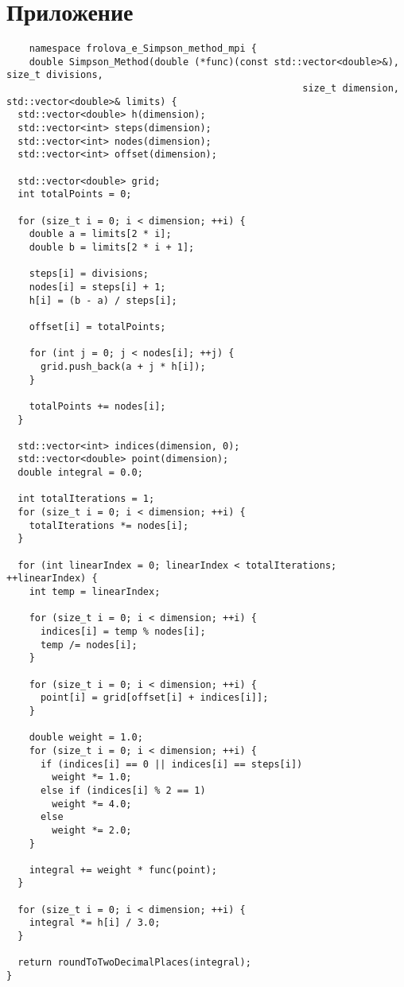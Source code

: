 \documentclass{report}
\begin{document}
\section*{Приложение}
\begin{lstlisting}
    namespace frolova_e_Simpson_method_mpi {
    double Simpson_Method(double (*func)(const std::vector<double>&), size_t divisions,
                                                    size_t dimension, std::vector<double>& limits) {
  std::vector<double> h(dimension);
  std::vector<int> steps(dimension);
  std::vector<int> nodes(dimension);
  std::vector<int> offset(dimension);

  std::vector<double> grid;
  int totalPoints = 0;

  for (size_t i = 0; i < dimension; ++i) {
    double a = limits[2 * i];
    double b = limits[2 * i + 1];

    steps[i] = divisions;
    nodes[i] = steps[i] + 1;
    h[i] = (b - a) / steps[i];

    offset[i] = totalPoints;

    for (int j = 0; j < nodes[i]; ++j) {
      grid.push_back(a + j * h[i]);
    }

    totalPoints += nodes[i];
  }

  std::vector<int> indices(dimension, 0);
  std::vector<double> point(dimension);
  double integral = 0.0;

  int totalIterations = 1;
  for (size_t i = 0; i < dimension; ++i) {
    totalIterations *= nodes[i];
  }

  for (int linearIndex = 0; linearIndex < totalIterations; ++linearIndex) {
    int temp = linearIndex;

    for (size_t i = 0; i < dimension; ++i) {
      indices[i] = temp % nodes[i];
      temp /= nodes[i];
    }

    for (size_t i = 0; i < dimension; ++i) {
      point[i] = grid[offset[i] + indices[i]];
    }

    double weight = 1.0;
    for (size_t i = 0; i < dimension; ++i) {
      if (indices[i] == 0 || indices[i] == steps[i])
        weight *= 1.0;
      else if (indices[i] % 2 == 1)
        weight *= 4.0;
      else
        weight *= 2.0;
    }

    integral += weight * func(point);
  }

  for (size_t i = 0; i < dimension; ++i) {
    integral *= h[i] / 3.0;
  }

  return roundToTwoDecimalPlaces(integral);
}


\end{lstlisting}
\end{document}
